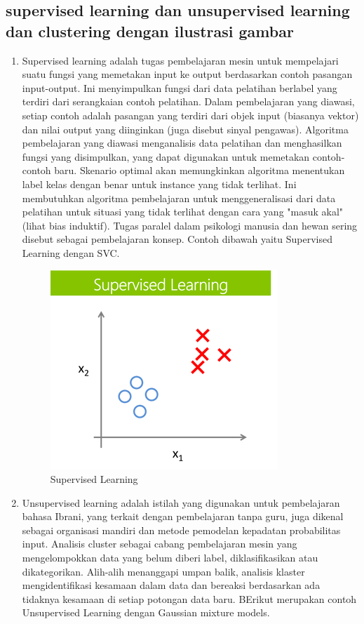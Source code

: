 \subsection{supervised learning dan unsupervised learning dan clustering dengan ilustrasi gambar}
\begin{enumerate}
\item Supervised learning adalah tugas pembelajaran mesin untuk mempelajari suatu fungsi yang memetakan input ke output berdasarkan contoh pasangan input-output. Ini menyimpulkan fungsi dari data pelatihan berlabel yang terdiri dari serangkaian contoh pelatihan. Dalam pembelajaran yang diawasi, setiap contoh adalah pasangan yang terdiri dari objek input (biasanya vektor) dan nilai output yang diinginkan (juga disebut sinyal pengawas). Algoritma pembelajaran yang diawasi menganalisis data pelatihan dan menghasilkan fungsi yang disimpulkan, yang dapat digunakan untuk memetakan contoh-contoh baru. Skenario optimal akan memungkinkan algoritma menentukan label kelas dengan benar untuk instance yang tidak terlihat. Ini membutuhkan algoritma pembelajaran untuk menggeneralisasi dari data pelatihan untuk situasi yang tidak terlihat dengan cara yang "masuk akal" (lihat bias induktif). Tugas paralel dalam psikologi manusia dan hewan sering disebut sebagai pembelajaran konsep. Contoh dibawah yaitu Supervised Learning dengan SVC.
\begin{figure}[ht]
\centering
\includegraphics[scale=0.5]{figures/AFS/andri2.png}
\caption{Supervised Learning}
\label{contoh}
\end{figure}
\item Unsupervised learning adalah istilah yang digunakan untuk pembelajaran bahasa Ibrani, yang terkait dengan pembelajaran tanpa guru, juga dikenal sebagai organisasi mandiri dan metode pemodelan kepadatan probabilitas input. Analisis cluster sebagai cabang pembelajaran mesin yang mengelompokkan data yang belum diberi label, diklasifikasikan atau dikategorikan. Alih-alih menanggapi umpan balik, analisis klaster mengidentifikasi kesamaan dalam data dan bereaksi berdasarkan ada tidaknya kesamaan di setiap potongan data baru. BErikut merupakan contoh Unsupervised Learning dengan Gaussian mixture models.

\end{enumerate}
